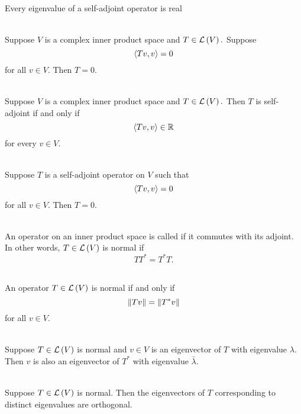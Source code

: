 \\
Every eigenvalue of a self-adjoint operator is real

\\
Suppose $V$ is a complex inner product space and $T \in \mathcal{L}\left({V}\right).$ Suppose $$\left\langle{Tv,v}\right\rangle=0$$ for all $v \in V$. Then $T =0$.

\\
Suppose $V$ is a complex inner product space and $T \in \mathcal{L}\left({V}\right).$ Then $T$ is self-adjoint if and only if 
$$\left\langle{Tv,v}\right\rangle \in \mathbb{R}$$
for every $v \in V$.

\\
Suppose $T$ is a self-adjoint operator on $V$ such that
$$\left\langle{Tv, v}\right\rangle = 0$$
for all $v \in V$. Then $T = 0$.

\\An operator on an inner product space is called  if it commutes with its adjoint. In other words, $T \in \mathcal{L}\left({V}\right)$ is normal if $$TT^* = T^* T.$$

\\
An operator $T \in \mathcal{L}\left({V}\right)$ is normal if and only if $$\left\| {Tv} \right\| = \left\| {T^*v} \right\|$$ for all $v \in V$.

\\
Suppose $T \in \mathcal{L}\left({V}\right)$ is normal and $v \in V$ is an eigenvector of $T$ with eigenvalue $\lambda$. Then $v$ is also an eigenvector of $T^*$ with eigenvalue $\bar{\lambda}$.

\\
Suppose $T \in \mathcal{L}\left({V}\right)$ is normal. Then the eigenvectors of $T$ corresponding to distinct eigenvalues are orthogonal.